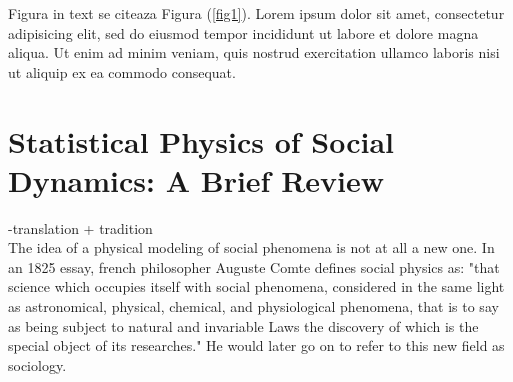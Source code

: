 \documentclass[12pt,openright,twoside]{book}
\begin{document}
Figura in text se citeaza Figura (\ref{fig1}). Lorem ipsum dolor sit amet, consectetur adipisicing elit, sed do eiusmod tempor incididunt ut labore et dolore magna aliqua. Ut enim ad minim veniam, quis nostrud exercitation ullamco laboris nisi ut aliquip ex ea commodo consequat.\\

\chapter{Statistical Physics of Social Dynamics: A Brief Review}

-translation + tradition\\
The idea of a physical modeling of social phenomena is not at all a new one. In an 1825 essay, french philosopher Auguste Comte defines social physics as: "that science which occupies itself with social phenomena, considered in the same light as astronomical, physical, chemical, and physiological phenomena, that is to say as being subject to natural and invariable Laws the discovery of which is the special object of its researches."\cite{iggers_1959,comte_1825} He would later go on to refer to this new field as sociology.\\
\end{document}
